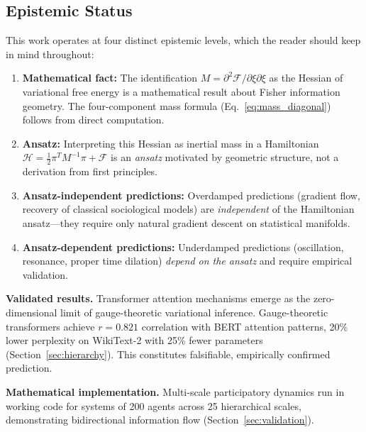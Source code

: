 \documentclass[11pt]{article}
\begin{document}
\subsection{Epistemic Status}
\label{sec:epistemic_status}

This work operates at four distinct epistemic levels, which the reader should keep in mind throughout:

\begin{tcolorbox}[colback=yellow!5,colframe=orange!75,title=Epistemic Distinctions]
\begin{enumerate}
\item \textbf{Mathematical fact:} The identification $M = \partial^2\mathcal{F}/\partial\xi\partial\xi$ as the Hessian of variational free energy is a mathematical result about Fisher information geometry. The four-component mass formula (Eq.~\ref{eq:mass_diagonal}) follows from direct computation.

\item \textbf{Ansatz:} Interpreting this Hessian as inertial mass in a Hamiltonian $\mathcal{H} = \frac{1}{2}\pi^T M^{-1}\pi + \mathcal{F}$ is an \emph{ansatz} motivated by geometric structure, not a derivation from first principles.

\item \textbf{Ansatz-independent predictions:} Overdamped predictions (gradient flow, recovery of classical sociological models) are \emph{independent} of the Hamiltonian ansatz---they require only natural gradient descent on statistical manifolds.

\item \textbf{Ansatz-dependent predictions:} Underdamped predictions (oscillation, resonance, proper time dilation) \emph{depend on the ansatz} and require empirical validation.
\end{enumerate}
\end{tcolorbox}

\textbf{Validated results.} Transformer attention mechanisms emerge as the zero-dimensional limit of gauge-theoretic variational inference. Gauge-theoretic transformers achieve $r = 0.821$ correlation with BERT attention patterns, 20\% lower perplexity on WikiText-2 with 25\% fewer parameters (Section~\ref{sec:hierarchy}). This constitutes falsifiable, empirically confirmed prediction.

\textbf{Mathematical implementation.} Multi-scale participatory dynamics run in working code for systems of 200 agents across 25 hierarchical scales, demonstrating bidirectional information flow (Section~\ref{sec:validation}).
\end{document}
